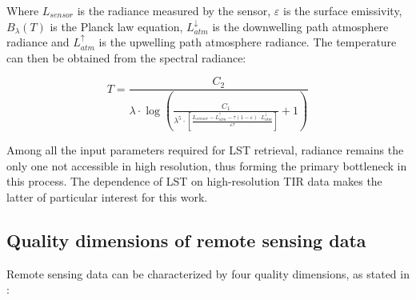         Where $L_{sensor}$ is the radiance measured by the sensor, $\varepsilon$ is the surface emissivity, $B_{\lambda}(T)$ is the Planck law equation, $L_{atm}^{\downarrow}$ is the downwelling path atmosphere radiance and $L_{atm}^{\uparrow}$ is the upwelling path atmosphere radiance. 
        The temperature can then be obtained from the spectral radiance:

        \begin{equation}
            T = \frac{C_2}{\lambda \cdot \log\left(\frac{C_1}{\lambda^5 \cdot \left[ \frac{L_{sensor} - L_{atm}^{\uparrow}- \tau (1 - \varepsilon) \cdot L_{atm}^{\downarrow}}{\varepsilon \tau}  \right]}+1\right)}
        \end{equation}

        Among all the input parameters required for LST retrieval, radiance remains the only one not accessible in high resolution, thus forming the primary bottleneck in this process. The dependence of LST on high-resolution TIR data makes the latter of particular interest for this work.       

    \subsection{Quality dimensions of remote sensing data}

    Remote sensing data can be characterized by four quality dimensions, as stated in \cite{HORNING20082986}:

